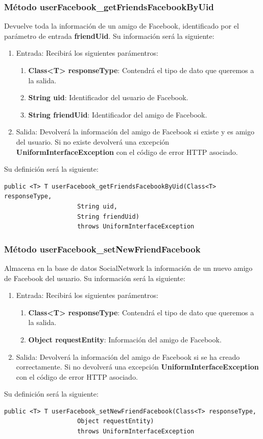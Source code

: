 \subsubsection{Método userFacebook\_getFriendsFacebookByUid}
Devuelve toda la información de un amigo de Facebook, identificado por el parámetro de entrada \textbf{friendUid}. Su información será la siguiente:
\begin{enumerate}
\item Entrada: Recibirá los siguientes parámentros:
\begin{enumerate}
\item \textbf{Class<T> responseType}: Contendrá el tipo de dato que queremos a la salida.
\item \textbf{String uid}: Identificador del usuario de Facebook.
\item \textbf{String friendUid}: Identificador del amigo de Facebook.
\end{enumerate}
\item Salida: Devolverá la información del amigo de Facebook si existe y es amigo del usuario. Si no existe devolverá una excepción \textbf{UniformInterfaceException} con el código de error HTTP asociado.
\end{enumerate}
\bigskip
\par
Su definición será la siguiente:
\begin{verbatim}public <T> T userFacebook_getFriendsFacebookByUid(Class<T> responseType, 
					String uid, 
					String friendUid) 
					throws UniformInterfaceException \end{verbatim}

\subsubsection{Método userFacebook\_setNewFriendFacebook}
Almacena en la base de datos SocialNetwork la información de un nuevo amigo de Facebook del usuario. Su información será la siguiente:
\begin{enumerate}
\item Entrada: Recibirá los siguientes parámentros:
\begin{enumerate}
\item \textbf{Class<T> responseType}: Contendrá el tipo de dato que queremos a la salida.
\item \textbf{Object requestEntity}: Información del amigo de Facebook.
\end{enumerate}
\item Salida: Devolverá la información del amigo de Facebook si se ha creado correctamente. Si no devolverá una excepción \textbf{UniformInterfaceException} con el código de error HTTP asociado.
\end{enumerate}
\bigskip
\par
Su definición será la siguiente:
\begin{verbatim}public <T> T userFacebook_setNewFriendFacebook(Class<T> responseType, 
					Object requestEntity) 
					throws UniformInterfaceException \end{verbatim}

